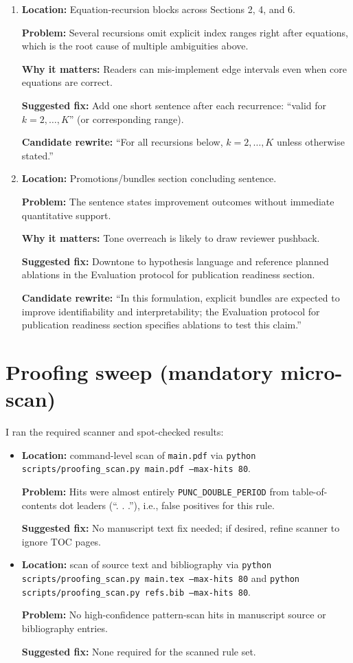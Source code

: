 \documentclass[11pt]{article}
\begin{document}
\begin{enumerate}
  \item \textbf{Location:} Equation-recursion blocks across Sections 2, 4, and 6.

  \textbf{Problem:} Several recursions omit explicit index ranges right after equations, which is the root cause of multiple ambiguities above.

  \textbf{Why it matters:} Readers can mis-implement edge intervals even when core equations are correct.

  \textbf{Suggested fix:} Add one short sentence after each recurrence: ``valid for $k=2,\dots,K$'' (or corresponding range).

  \textbf{Candidate rewrite:} ``For all recursions below, $k=2,\dots,K$ unless otherwise stated.''

  \item \textbf{Location:} Promotions/bundles section concluding sentence.

  \textbf{Problem:} The sentence states improvement outcomes without immediate quantitative support.

  \textbf{Why it matters:} Tone overreach is likely to draw reviewer pushback.

  \textbf{Suggested fix:} Downtone to hypothesis language and reference planned ablations in the Evaluation protocol for publication readiness section.

  \textbf{Candidate rewrite:} ``In this formulation, explicit bundles are expected to improve identifiability and interpretability; the Evaluation protocol for publication readiness section specifies ablations to test this claim.''
\end{enumerate}

\section*{Proofing sweep (mandatory micro-scan)}

I ran the required scanner and spot-checked results:

\begin{itemize}
  \item \textbf{Location:} command-level scan of \texttt{main.pdf} via \texttt{python scripts/proofing\_scan.py main.pdf --max-hits 80}.

  \textbf{Problem:} Hits were almost entirely \texttt{PUNC\_DOUBLE\_PERIOD} from table-of-contents dot leaders (``. . .''), i.e., false positives for this rule.

  \textbf{Suggested fix:} No manuscript text fix needed; if desired, refine scanner to ignore TOC pages.

  \item \textbf{Location:} scan of source text and bibliography via \texttt{python scripts/proofing\_scan.py main.tex --max-hits 80} and \texttt{python scripts/proofing\_scan.py refs.bib --max-hits 80}.

  \textbf{Problem:} No high-confidence pattern-scan hits in manuscript source or bibliography entries.

  \textbf{Suggested fix:} None required for the scanned rule set.
\end{itemize}
\end{document}
